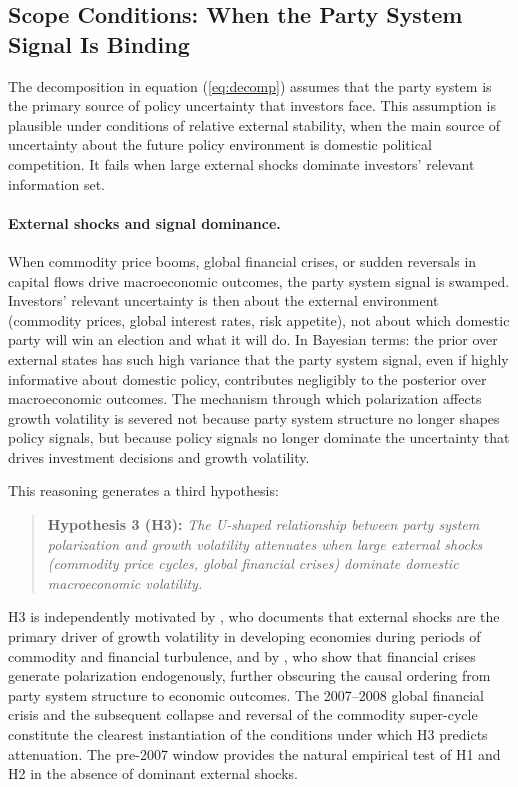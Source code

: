 \documentclass[12pt]{article}
\begin{document}
\subsection{Scope Conditions: When the Party System Signal Is Binding}

The decomposition in equation (\ref{eq:decomp}) assumes that the party system
is the primary source of policy uncertainty that investors face. This
assumption is plausible under conditions of relative external stability, when
the main source of uncertainty about the future policy environment is
domestic political competition. It fails when large external shocks dominate
investors' relevant information set.

\paragraph{External shocks and signal dominance.} When commodity price
booms, global financial crises, or sudden reversals in capital flows drive
macroeconomic outcomes, the party system signal is swamped. Investors'
relevant uncertainty is then about the external environment (commodity
prices, global interest rates, risk appetite), not about which domestic
party will win an election and what it will do. In Bayesian terms: the
prior over external states has such high variance that the party system
signal, even if highly informative about domestic policy, contributes
negligibly to the posterior over macroeconomic outcomes. The mechanism
through which polarization affects growth volatility is severed not because
party system structure no longer shapes policy signals, but because policy
signals no longer dominate the uncertainty that drives investment decisions
and growth volatility.

This reasoning generates a third hypothesis:

\begin{quote}
\textbf{Hypothesis 3 (H3):} \textit{The U-shaped relationship between party
system polarization and growth volatility attenuates when large external
shocks (commodity price cycles, global financial crises) dominate
domestic macroeconomic volatility.}
\end{quote}

\noindent H3 is independently motivated by \citet{Raddatz2007}, who
documents that external shocks are the primary driver of growth volatility in
developing economies during periods of commodity and financial turbulence,
and by \citet{FunkeST2016}, who show that financial crises generate
polarization endogenously, further obscuring the causal ordering from
party system structure to economic outcomes. The 2007--2008 global financial
crisis and the subsequent collapse and reversal of the commodity super-cycle
constitute the clearest instantiation of the conditions under which H3
predicts attenuation. The pre-2007 window provides the natural empirical
test of H1 and H2 in the absence of dominant external shocks.
\end{document}
